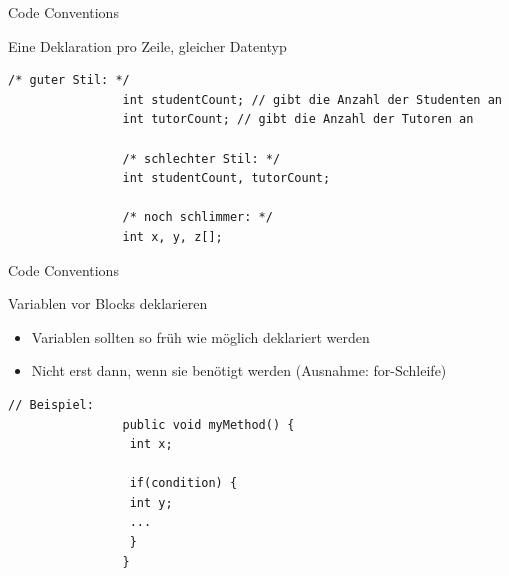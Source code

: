 \documentclass[18pt]{beamer}
\begin{document}
\begin{frame}[fragile]{Code Conventions}
        \begin{block}{Eine Deklaration pro Zeile, gleicher Datentyp}
                \begin{lstlisting}[basicstyle=\scriptsize]
                /* guter Stil: */                
                int studentCount; // gibt die Anzahl der Studenten an
                int tutorCount; // gibt die Anzahl der Tutoren an
                
                /* schlechter Stil: */
                int studentCount, tutorCount;
                
                /* noch schlimmer: */
                int x, y, z[];
                \end{lstlisting}
        \end{block}
\end{frame}

\begin{frame}[fragile]{Code Conventions}
        \begin{block}{Variablen vor Blocks deklarieren}
                \begin{itemize}
                        \item Variablen sollten so früh wie möglich deklariert werden
                        \item Nicht erst dann, wenn sie benötigt werden (Ausnahme: for-Schleife)
                \end{itemize}
                \begin{lstlisting}[basicstyle=\scriptsize]
                // Beispiel:
                public void myMethod() {
                 int x;
                        
                 if(condition) {
                 int y;
                 ...
                 }
                }
                \end{lstlisting}
        \end{block}
\end{frame}
\end{document}
